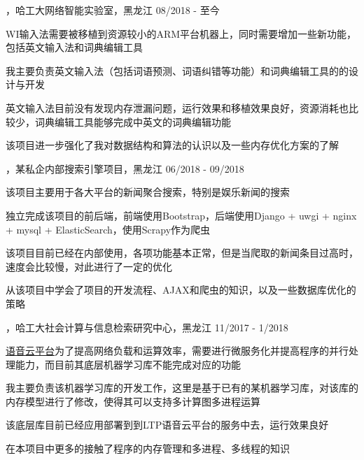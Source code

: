 
\begin{cventries}

\cvexperience
{，哈工大网络智能实验室，黑龙江}
{08/2018 - 至今}
{
    \begin{cvitems}
    \item {WI输入法需要被移植到资源较小的ARM平台机器上，同时需要增加一些新功能，包括英文输入法和词典编辑工具}
    \item {我主要负责英文输入法（包括词语预测、词语纠错等功能）和词典编辑工具的的设计与开发}
    \item {英文输入法目前没有发现内存泄漏问题，运行效果和移植效果良好，资源消耗也比较少，词典编辑工具能够完成中英文的词典编辑功能}
    \item {该项目进一步强化了我对数据结构和算法的认识以及一些内存优化方案的了解}
    \end{cvitems}
}

\cvexperience
{，某私企内部搜索引擎项目，黑龙江}
{06/2018 - 09/2018}
{
    \begin{cvitems}
    \item {该项目主要用于各大平台的新闻聚合搜索，特别是娱乐新闻的搜索}
    \item {独立完成该项目的前后端，前端使用Bootstrap，后端使用Django + uwgi + nginx + mysql + ElasticSearch，使用Scrapy作为爬虫}
    \item {该项目目前已经在内部使用，各项功能基本正常，但是当爬取的新闻条目过高时，速度会比较慢，对此进行了一定的优化}
    \item {从该项目中学会了项目的开发流程、AJAX和爬虫的知识，以及一些数据库优化的策略}
    \end{cvitems}
}

\cvexperience
{，哈工大社会计算与信息检索研究中心，黑龙江}
{11/2017 - 1/2018}
{
    \begin{cvitems}
    \item {\href{https://www.ltp-cloud.com/}{语音云平台}为了提高网络负载和运算效率，需要进行微服务化并提高程序的并行处理能力，而目前其底层机器学习库不能完成对应的功能}
    \item {我主要负责该机器学习库的开发工作，这里是基于已有的某机器学习库，对该库的内存模型进行了修改，使得其可以支持多计算图多进程运算}
    \item {该底层库目前已经应用部署到到LTP语音云平台的服务中去，运行效果良好}
    \item {在本项目中更多的接触了程序的内存管理和多进程、多线程的知识}
    \end{cvitems}
}

\end{cventries}